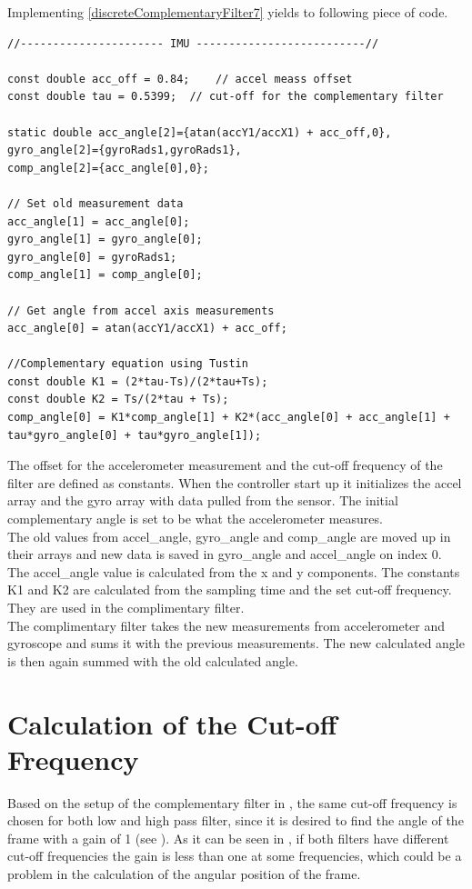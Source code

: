 Implementing \eqref{discreteComplementaryFilter7} yields to following piece of code. 

\begin{lstlisting}[caption  = {Code for the implementation of the complementary filter in C\texttt{++}. The comp\_angle[0] is the newest found angle of the frame.},
label    = codeCompFilter ]
//---------------------- IMU --------------------------//

const double acc_off = 0.84;  	// accel meass offset
const double tau = 0.5399;	// cut-off for the complementary filter

static double acc_angle[2]={atan(accY1/accX1) + acc_off,0},
gyro_angle[2]={gyroRads1,gyroRads1},
comp_angle[2]={acc_angle[0],0};

// Set old measurement data
acc_angle[1] = acc_angle[0];
gyro_angle[1] = gyro_angle[0];
gyro_angle[0] = gyroRads1;
comp_angle[1] = comp_angle[0];

// Get angle from accel axis measurements
acc_angle[0] = atan(accY1/accX1) + acc_off;

//Complementary equation using Tustin
const double K1 = (2*tau-Ts)/(2*tau+Ts);
const double K2 = Ts/(2*tau + Ts);
comp_angle[0] = K1*comp_angle[1] + K2*(acc_angle[0] + acc_angle[1] + tau*gyro_angle[0] + tau*gyro_angle[1]);
\end{lstlisting}
The offset for the accelerometer measurement and the cut-off frequency of the filter are defined as constants. When the controller start up it initializes the accel array and the gyro array with data pulled from the sensor. The initial complementary angle is set to be what the accelerometer measures.\\
The old values from accel\_angle, gyro\_angle and comp\_angle are moved up in their arrays and new data is saved in gyro\_angle and accel\_angle on index 0. The accel\_angle value is calculated from the x and y components.
The constants K1 and K2 are calculated from the sampling time and the set cut-off frequency. They are used in the complimentary filter.\\
The complimentary filter takes the new measurements from accelerometer and gyroscope and sums it with the previous measurements. The new calculated angle is then again summed with the old calculated angle.

\section{Calculation of the Cut-off Frequency}
Based on the setup of the complementary filter in , the same cut-off frequency is chosen for both low and high pass filter, since it is desired to find the angle of the frame with a gain of 1 (see ). As it can be seen in , if both filters have different cut-off frequencies the gain is less than one at some frequencies, which could be a problem in the calculation of the angular position of the frame. 

